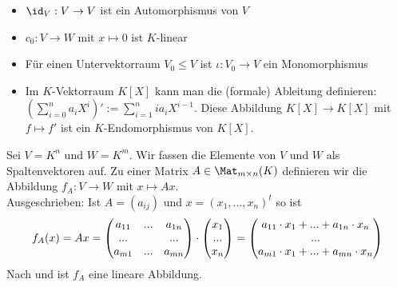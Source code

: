 \begin{example}
	\begin{itemize}
		\item $\id_V: V\to V$ ist ein Automorphismus von $V$
		\item $c_0:V\to W$ mit $x\mapsto 0$ ist $K$-linear
		\item Für einen Untervektorraum $V_0\le V$ ist $\iota: V_0\to V$ ein Monomorphismus
		\item Im $K$-Vektorraum $K[X]$ kann man die (formale) Ableitung definieren: $(\sum_{i=0}^n a_iX^i)' := \sum
		_{i=1}^n ia_iX^{i-1}$. Diese Abbildung $K[X]\to K[X]$ mit $f\mapsto f'$ ist ein $K$-Endomorphismus von $K[X]$.
	\end{itemize}
\end{example}

\begin{example}
	Sei $V=K^n$ und $W=K^m$. Wir fassen die Elemente von $V$ und $W$ als Spaltenvektoren auf. Zu einer 
	Matrix $A\in \Mat_{m\times n}(K)$ definieren wir die Abbildung $f_A:V\to W$ mit $x\mapsto Ax$. \\
	Ausgeschrieben: Ist $A=(a_{ij})$ und $x=(x_1,...,x_n)^t$ so ist
	\begin{align}
		f_A(x)=Ax=
		\begin{pmatrix}
		a_{11} & ... & a_{1n}\\
		... &  & ...\\
		a_{m1} & ... & a_{mn}\\
		\end{pmatrix} \cdot \begin{pmatrix} x_1 \\ ... \\ x_n\end{pmatrix} = 
		\begin{pmatrix}
		a_{11}\cdot x_1 + ... + a_{1n}\cdot x_n\\
		...\\
		a_{m1}\cdot x_1 + ... + a_{mn}\cdot x_n\\
		\end{pmatrix}\notag
	\end{align} 
	Nach  und  ist $f_A$ eine lineare Abbildung.
\end{example}

